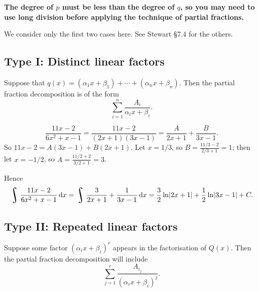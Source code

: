 \textbf{\color{red} The degree of $ p $ must be less than the degree of $ q $, so you may need to
use long division before applying the technique of partial fractions.}

We consider only the first two cases here. See Stewart \S 7.4 for the others.

\clearpage
\subsection*{Type I: Distinct linear factors}
Suppose that $ q(x) = (\alpha_1 x + \beta_1) + \cdots + (\alpha_n x + \beta_n) $. Then the partial
fraction decomposition is of the form
\begin{displaymath}
  \sum_{i = 1}^n \dfrac{A_i}{\alpha_i x + \beta_i}.
\end{displaymath}

\begin{ex}
  \begin{displaymath}
    \dfrac{11x - 2}{6x^2 + x - 1} = \dfrac{11x - 2}{(2x + 1)(3x - 1)} = \dfrac{A}{2x + 1} + \dfrac{B}{3x - 1}.
  \end{displaymath}
  So $ 11x - 2 = A(3x - 1) + B(2x + 1) $. Let $ x = 1/3 $, so $ B = \frac{11/3 - 2}{2/3 + 1} = 1 $;
  then let $ x = -1/2 $, so $ A = \frac{11/2 + 2}{3/2 + 1} = 3 $.

  Hence
  \begin{displaymath}
    \rint \dfrac{11x - 2}{6x^2 + x - 1} \dif{x} = \rint \dfrac{3}{2x + 1} + \dfrac{1}{3x - 1} \dif{x}
      = \dfrac{3}{2} \ln\abs{2x + 1} + \dfrac{1}{2} \ln\abs{3x - 1} + C.
  \end{displaymath}
\end{ex}

\subsection*{Type II: Repeated linear factors}
Suppose some factor $ (\alpha_i x + \beta_i)^r $ appears in the factorisation of $ Q(x) $. Then
the partial fraction decomposition will include
\begin{displaymath}
  \sum_{j = 1}^{r} \frac{A_{i_j}}{(\alpha_i x + \beta_i)^j}.
\end{displaymath}

